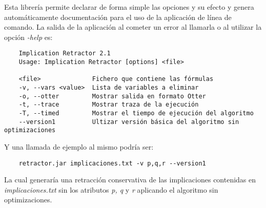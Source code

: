 	Esta librería permite declarar de forma simple las opciones y su efecto y genera automáticamente documentación para el uso de la aplicación de línea de comando. La salida de la aplicación al cometer un error al llamarla o al utilizar la opción \textit{-help} es:


	\begin{verbatim}
	Implication Retractor 2.1
	Usage: Implication Retractor [options] <file>
	
	<file>              Fichero que contiene las fórmulas
	-v, --vars <value>  Lista de variables a eliminar
	-o, --otter         Mostrar salida en formato Otter
	-t, --trace         Mostrar traza de la ejecución
	-T, --timed         Mostrar el tiempo de ejecución del algoritmo
	--version1          Ultizar versión básica del algoritmo sin optimizaciones
	\end{verbatim}
	
	Y una llamada de ejemplo al mismo podría ser:
	
	\begin{verbatim}
	retractor.jar implicaciones.txt -v p,q,r --version1
	\end{verbatim}
	
	La cual generaría una retracción conservativa de las implicaciones contenidas en \textit{implicaciones.txt} sin los atributos \textit{p, q} y \textit{r} aplicando el algoritmo sin optimizaciones. 
	
	
		
		
	
	
	
	
	
	
	
	
	
	
	
	
	
	